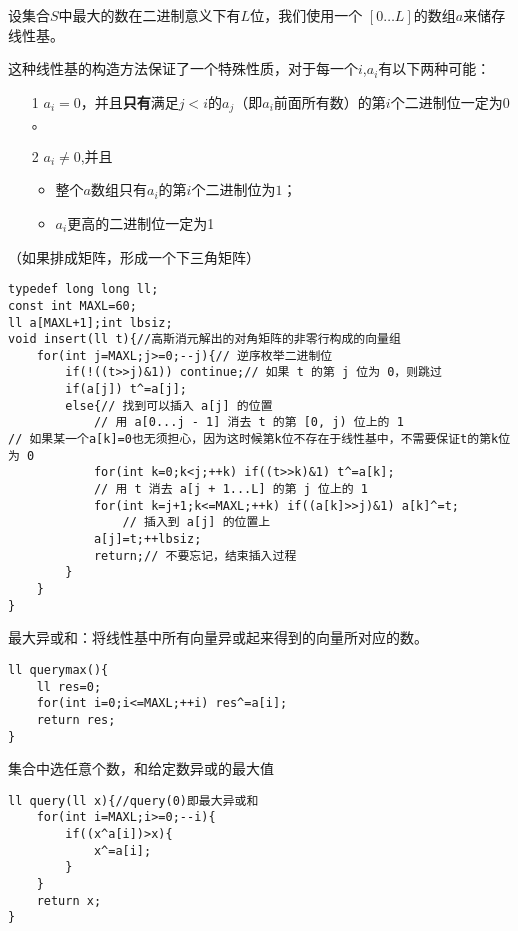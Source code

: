 \documentclass[UTF8]{ctexart}
\begin{document}
设集合$S$中最大的数在二进制意义下有$L$位，我们使用一个 $[0\dots L]$的数组$a$来储存线性基。

这种线性基的构造方法保证了一个特殊性质，对于每一个$i$,$a_i$有以下两种可能：
\begin{itemize}
    \item[1] $a_i=0$，并且\textbf{只有}满足$j<i$的$a_j$（即$a_i$前面所有数）的第$i$个二进制位一定为$0$。
    \item[2]  $a_i\neq0$,并且
        \begin{itemize}
            \item 整个$a$数组只有$a_i$的第$i$个二进制位为$1$；
            \item $a_i$更高的二进制位一定为1
        \end{itemize}
\end{itemize}

（如果排成矩阵，形成一个下三角矩阵）

\begin{lstlisting}
typedef long long ll;
const int MAXL=60;
ll a[MAXL+1];int lbsiz;
void insert(ll t){//高斯消元解出的对角矩阵的非零行构成的向量组 
    for(int j=MAXL;j>=0;--j){// 逆序枚举二进制位
        if(!((t>>j)&1)) continue;// 如果 t 的第 j 位为 0，则跳过
        if(a[j]) t^=a[j];
        else{// 找到可以插入 a[j] 的位置
            // 用 a[0...j - 1] 消去 t 的第 [0, j) 位上的 1
// 如果某一个a[k]=0也无须担心，因为这时候第k位不存在于线性基中，不需要保证t的第k位为 0	
            for(int k=0;k<j;++k) if((t>>k)&1) t^=a[k];
            // 用 t 消去 a[j + 1...L] 的第 j 位上的 1
            for(int k=j+1;k<=MAXL;++k) if((a[k]>>j)&1) a[k]^=t;
                // 插入到 a[j] 的位置上
            a[j]=t;++lbsiz;
            return;// 不要忘记，结束插入过程
        }
    }
}
\end{lstlisting}

最大异或和：将线性基中所有向量异或起来得到的向量所对应的数。

\begin{lstlisting}
ll querymax(){
    ll res=0;
    for(int i=0;i<=MAXL;++i) res^=a[i];
    return res;
}
\end{lstlisting}

集合中选任意个数，和给定数异或的最大值

\begin{lstlisting}
ll query(ll x){//query(0)即最大异或和
    for(int i=MAXL;i>=0;--i){
        if((x^a[i])>x){
            x^=a[i];
        }
    }
    return x;
}
\end{lstlisting}
\end{document}
